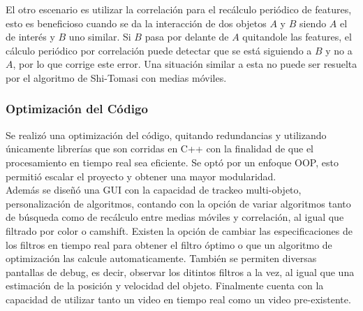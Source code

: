 El otro escenario es utilizar la correlación para el recálculo periódico de features, esto es beneficioso cuando se da la interacción de dos objetos $A$ y $B$ siendo $A$ el de interés y $B$ uno similar. Si $B$ pasa por delante de $A$ quitandole las features, el cálculo periódico por correlación puede detectar que se está siguiendo a $B$ y no a $A$, por lo que corrige este error. Una situación similar a esta no puede ser resuelta por el algoritmo de Shi-Tomasi con medias móviles.



































\subsubsection{Optimización del Código}
Se realizó una optimización del código, quitando redundancias y utilizando únicamente librerías que son corridas en C++ con la finalidad de que el procesamiento en tiempo real sea eficiente. Se optó por un enfoque OOP, esto permitió escalar el proyecto y obtener una mayor modularidad. \\
Además se diseñó una GUI con la capacidad de trackeo multi-objeto, personalización de algoritmos, contando con la opción de variar algoritmos tanto de búsqueda como de recálculo entre medias móviles y correlación, al igual que filtrado por color o camshift. Existen la opción de cambiar las especificaciones de los filtros en tiempo real para obtener el filtro óptimo o que un algoritmo de optimización las calcule automaticamente. También se permiten diversas pantallas de debug, es decir, observar los ditintos filtros a la vez, al igual que una estimación de la posición y velocidad del objeto. Finalmente cuenta con la capacidad de utilizar tanto un video en tiempo real como un video pre-existente.










